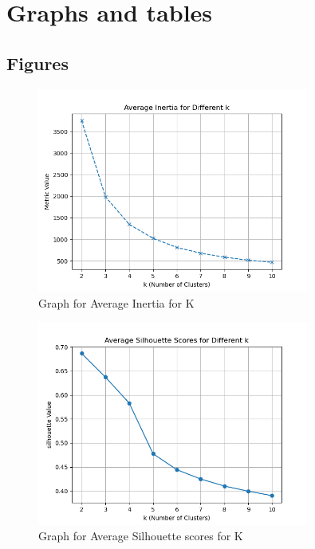 \chapter{Graphs and tables}\label{ch:graphs-and-tables}


\section{Figures}\label{sec:figures}

\begin{figure}[ht]
\centering
\includegraphics[width=0.8\textwidth]{Pictures/Average Inertia}
\caption{Graph for Average Inertia for K}
\label{fig:1}
\end{figure}

\begin{figure}[ht]
\centering
\includegraphics[width=0.8\textwidth]{Pictures/Average Silhouette Score}
\caption{Graph for Average Silhouette scores for K}
\label{fig:2}
\end{figure}

